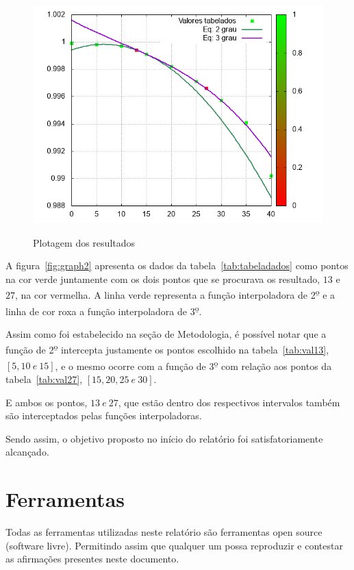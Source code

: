 \documentclass[12pt, hidelinks]{article}
\begin{document}
\begin{figure}[!h]
  \centering
  \includegraphics[width=15cm]{figuras/graph2.png}\\
  \caption{Plotagem dos resultados}
  \label{fig:graph2}
\end{figure}

A figura~\eqref{fig:graph2} apresenta os dados da tabela~\eqref{tab:tabeladados} como pontos na cor verde juntamente com os dois pontos que se procurava os resultado, $13$ e $27$, na cor vermelha. A linha verde representa a função interpoladora de 2\textsuperscript{\b{o}} e a linha de cor roxa a função interpoladora de 3\textsuperscript{\b{o}}.

Assim como foi estabelecido na seção de Metodologia, é possível notar que a função de 2\textsuperscript{\b{o}} intercepta justamente os pontos escolhido na tabela~\eqref{tab:val13}, $[5, 10~e~15]$, e o mesmo ocorre com a função de 3\textsuperscript{\b{o}} com relação aos pontos da tabela~\eqref{tab:val27}, $[15, 20, 25~e~30]$.

E ambos os pontos, $13~e~27$, que estão dentro dos respectivos intervalos também são interceptados pelas funções interpoladoras.

Sendo assim, o objetivo proposto no início do relatório foi satisfatoriamente alcançado.

\newpage
\section{Ferramentas}
Todas as ferramentas utilizadas neste relatório são ferramentas open source (software livre).
Permitindo assim que qualquer um possa reproduzir e contestar as afirmações presentes neste documento.
\end{document}
